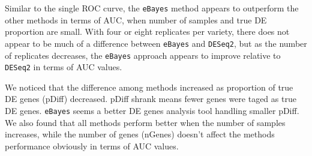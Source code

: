 Similar to the single ROC curve, the \texttt{eBayes} method appears to outperform the other methods in terms of AUC, when number of samples and true DE proportion are small. With four or eight replicates per variety, there does not appear to be much of a difference between \texttt{eBayes} and {\tt DESeq2}, but as the number of replicates decreases, the \texttt{eBayes} approach appears to improve relative to {\tt DESeq2} in terms of AUC values.

We noticed that the difference among methods increased as proportion of true DE genes (pDiff) decreased. pDiff shrank means fewer genes were taged as true DE genes. \texttt{eBayes} seems a better DE genes analysis tool handling smaller pDiff. We also found that all methods perform better when the number of samples increases, while the number of genes (nGenes) doesn't affect the methods performance obviously in terms of AUC values. 







